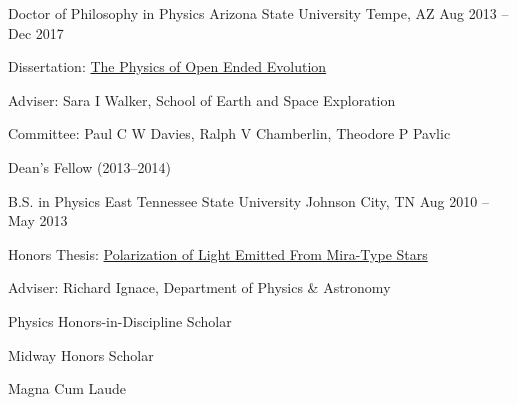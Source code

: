 
\begin{cventries}

\cventry
    {Doctor of Philosophy in Physics}
    {Arizona State University}
    {Tempe, AZ}
    {Aug 2013 -- Dec 2017}
    {
    \begin{cvitems}
       \item {Dissertation: \href{http://hdl.handle.net/2286/R.A.194133}{The Physics of Open Ended Evolution}}
       \item {Adviser: Sara I Walker, School of Earth and Space Exploration}
       \item {Committee: Paul C W Davies, Ralph V Chamberlin, Theodore P Pavlic}
       \item {Dean's Fellow (2013--2014)}
    \end{cvitems}
    }
    
\cventry
    {B.S. in Physics}
    {East Tennessee State University}
    {Johnson City, TN}
    {Aug 2010 -- May 2013}
    {
    \begin{cvitems}
       \item {Honors Thesis: \href{https://dc.etsu.edu/honors/118/}{Polarization of Light Emitted From Mira-Type Stars}}
       \item {Adviser: Richard Ignace, Department of Physics \& Astronomy}
       \item {Physics Honors-in-Discipline Scholar}
       \item {Midway Honors Scholar}
       \item {Magna Cum Laude}
    \end{cvitems}
    }

\end{cventries}